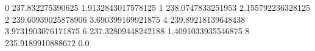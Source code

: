 0 237.832275390625 1.9132843017578125
1 238.0747833251953 2.155792236328125
2 239.60939025878906 3.690399169921875
4 239.89218139648438 3.9731903076171875
6 237.32809448242188 1.4091033935546875
8 235.9189910888672 0.0
